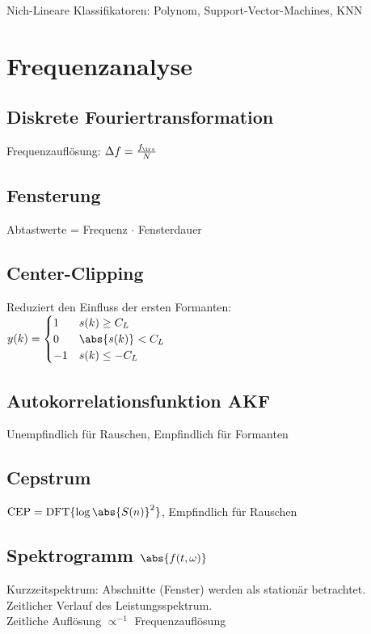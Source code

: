 \documentclass[fs, footer]{latex4ei}
\begin{document}
\begin{multicols*}{4}
Nich-Lineare Klassifikatoren: Polynom, Support-Vector-Machines, KNN


\section{Frequenzanalyse}

	\subsection{Diskrete Fouriertransformation}
	Frequenzauflösung: $\Delta f = \frac{f_{\ir s}}{N}$
	
	
	\subsection{Fensterung}
	Abtastwerte = Frequenz $\cdot$ Fensterdauer

	\subsection{Center-Clipping}
	Reduziert den Einfluss der ersten Formanten:\\
	$y(k) = \begin{cases} 1 & s(k) \ge C_L \\ 0 & \abs{s(k)} < C_L \\ -1 & s(k) \le -C_L \end{cases}$
	
	\subsection{Autokorrelationsfunktion AKF}
	Unempfindlich für Rauschen, Empfindlich für Formanten
	
	\subsection{Cepstrum}
	$\mathrm{CEP} = \mathrm{DFT}\{ \log \abs{S(n)}^2 \}$, Empfindlich für Rauschen
	
	\subsection{Spektrogramm $\abs{f(t,\omega)}$}
	Kurzzeitspektrum: Abschnitte (Fenster) werden als stationär betrachtet.
	Zeitlicher Verlauf des Leistungsspektrum. \\
	Zeitliche Auflösung $\propto^{-1}$ Frequenzauflösung
	



\end{multicols*}
\end{document}
